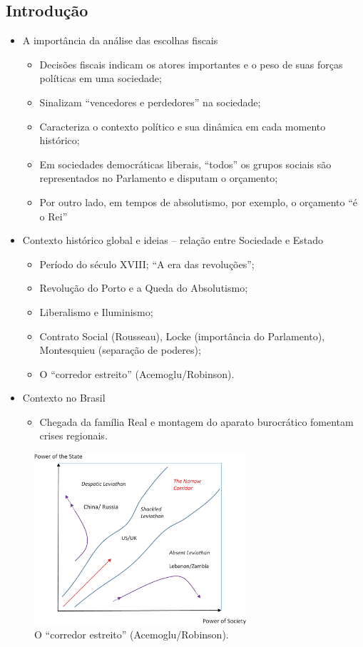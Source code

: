 \documentclass[a4paper,12pt]{article}[abntex2]
\begin{document}
\subsection{\textbf{Introdução}}
\begin{itemize}
    \item A importância da análise das escolhas fiscais
    \begin{itemize}
        \item Decisões fiscais indicam os atores importantes e o peso de suas
forças políticas em uma sociedade;
\item  Sinalizam “vencedores e perdedores” na sociedade;
\item Caracteriza o contexto político e sua dinâmica em cada momento
histórico;
\item Em sociedades democráticas liberais, “todos” os grupos sociais
são representados no Parlamento e disputam o orçamento;
\item Por outro lado, em tempos de absolutismo, por exemplo, o
orçamento “é o Rei”

    \end{itemize}
    \item Contexto histórico global e ideias – relação entre Sociedade e Estado
    \begin{itemize}
        \item Período do século XVIII; “A era das revoluções”;
        \item Revolução do Porto e a Queda do Absolutismo;
        \item Liberalismo e Iluminismo;
        \item Contrato Social (Rousseau), Locke (importância do Parlamento), Montesquieu (separação de poderes);
\item O “corredor estreito” (Acemoglu/Robinson).

    \end{itemize}
    \item Contexto no Brasil
    \begin{itemize}
        \item Chegada da família Real e montagem do aparato burocrático fomentam crises regionais.
    \end{itemize}
\end{itemize}

\begin{figure}[H]
    \centering
    \includegraphics[width=0.7\textwidth]{Imagens Slides/i1a5.png}
    \caption{O “corredor estreito” (Acemoglu/Robinson).}
\end{figure}
\end{document}
